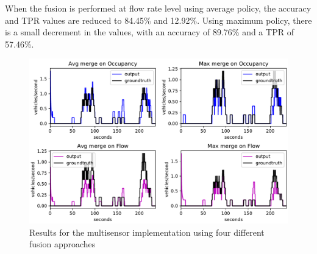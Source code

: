 When the fusion is performed at flow rate level using average policy, the accuracy and TPR values are reduced to 84.45\% and 12.92\%. Using maximum policy, there is a small decrement in the values, with an accuracy of 89.76\% and a TPR of 57.46\%.

\begin{figure}[htb!]
\centering
\includegraphics[scale=0.5]{fig/4/vl_res.pdf}
\caption{Results for the multisensor implementation using four different fusion approaches}
\label{vl_res}
\end{figure}

